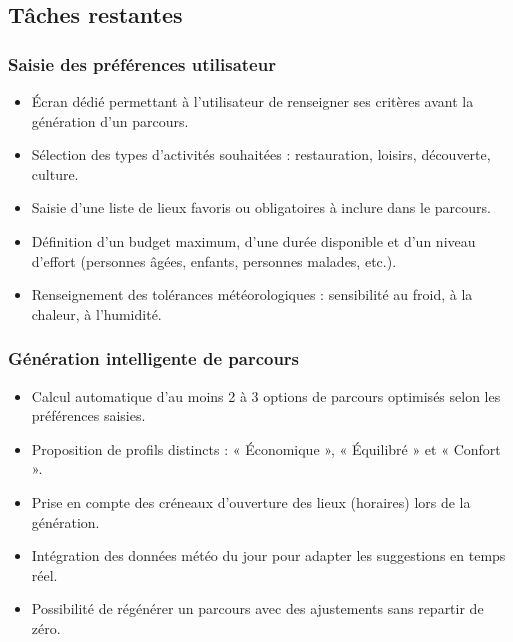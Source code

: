 \documentclass[a4paper, 12pt]{article}
\begin{document}
\begin{justify}
\subsection*{Tâches restantes}

\subsubsection*{Saisie des préférences utilisateur}
\begin{itemize}
    \item Écran dédié permettant à l'utilisateur de renseigner ses critères avant la génération d'un parcours.
    \item Sélection des types d'activités souhaitées : restauration, loisirs, découverte, culture.
    \item Saisie d'une liste de lieux favoris ou obligatoires à inclure dans le parcours.
    \item Définition d'un budget maximum, d'une durée disponible et d'un niveau d'effort (personnes âgées, enfants, personnes malades, etc.).
    \item Renseignement des tolérances météorologiques : sensibilité au froid, à la chaleur, à l'humidité.
\end{itemize}

\subsubsection*{Génération intelligente de parcours}
\begin{itemize}
    \item Calcul automatique d'au moins 2 à 3 options de parcours optimisés selon les préférences saisies.
    \item Proposition de profils distincts : « Économique », « Équilibré » et « Confort ».
    \item Prise en compte des créneaux d'ouverture des lieux (horaires) lors de la génération.
    \item Intégration des données météo du jour pour adapter les suggestions en temps réel.
    \item Possibilité de régénérer un parcours avec des ajustements sans repartir de zéro.
\end{itemize}


\end{justify}
\end{document}
